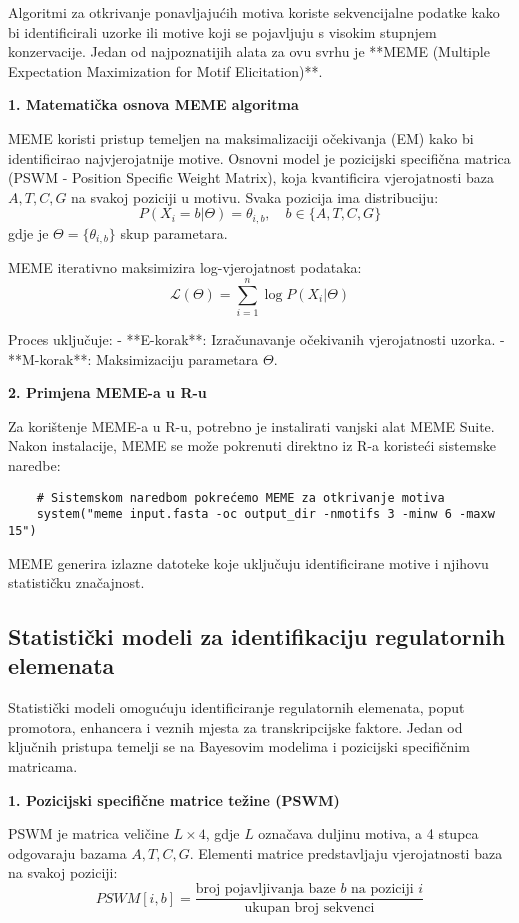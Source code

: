 \documentclass[10pt,a4paper,twoside]{article}
\begin{document}
Algoritmi za otkrivanje ponavljajućih motiva koriste sekvencijalne podatke kako bi identificirali uzorke ili motive koji se pojavljuju s visokim stupnjem konzervacije. Jedan od najpoznatijih alata za ovu svrhu je **MEME (Multiple Expectation Maximization for Motif Elicitation)**.

\textbf{1. Matematička osnova MEME algoritma}  

MEME koristi pristup temeljen na maksimalizaciji očekivanja (EM) kako bi identificirao najvjerojatnije motive. Osnovni model je pozicijski specifična matrica (PSWM - Position Specific Weight Matrix), koja kvantificira vjerojatnosti baza \( A, T, C, G \) na svakoj poziciji u motivu. Svaka pozicija ima distribuciju:
\[
P(X_i = b | \Theta) = \theta_{i,b}, \quad b \in \{A, T, C, G\}
\]
gdje je \( \Theta = \{\theta_{i,b}\} \) skup parametara.

MEME iterativno maksimizira log-vjerojatnost podataka:
\[
\mathcal{L}(\Theta) = \sum_{i=1}^n \log P(X_i | \Theta)
\]

Proces uključuje:
- **E-korak**: Izračunavanje očekivanih vjerojatnosti uzorka.
- **M-korak**: Maksimizaciju parametara \( \Theta \).

\textbf{2. Primjena MEME-a u R-u}  

Za korištenje MEME-a u R-u, potrebno je instalirati vanjski alat MEME Suite. Nakon instalacije, MEME se može pokrenuti direktno iz R-a koristeći sistemske naredbe:

\begin{verbatim}
	# Sistemskom naredbom pokrećemo MEME za otkrivanje motiva
	system("meme input.fasta -oc output_dir -nmotifs 3 -minw 6 -maxw 15")
\end{verbatim}

MEME generira izlazne datoteke koje uključuju identificirane motive i njihovu statističku značajnost.

\subsection*{Statistički modeli za identifikaciju regulatornih elemenata}

Statistički modeli omogućuju identificiranje regulatornih elemenata, poput promotora, enhancera i veznih mjesta za transkripcijske faktore. Jedan od ključnih pristupa temelji se na Bayesovim modelima i pozicijski specifičnim matricama.

\textbf{1. Pozicijski specifične matrice težine (PSWM)}  

PSWM je matrica veličine \( L \times 4 \), gdje \( L \) označava duljinu motiva, a 4 stupca odgovaraju bazama \( A, T, C, G \). Elementi matrice predstavljaju vjerojatnosti baza na svakoj poziciji:
\[
PSWM[i, b] = \frac{\text{broj pojavljivanja baze } b \text{ na poziciji } i}{\text{ukupan broj sekvenci}}
\]
\end{document}
